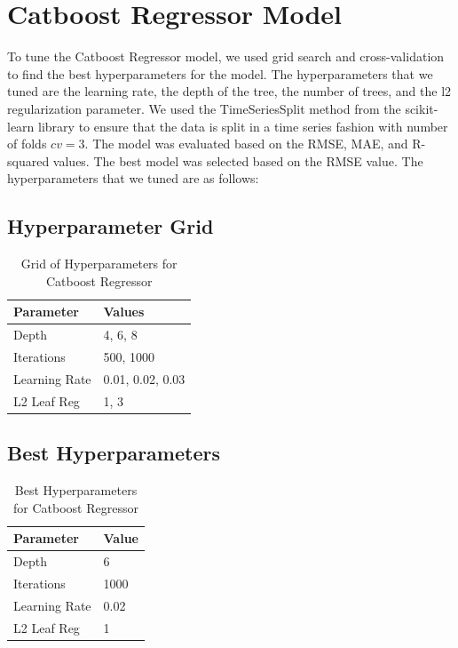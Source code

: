 \section{Catboost Regressor Model}
To tune the Catboost Regressor model, we used grid search and cross-validation to find the best hyperparameters for the model. The hyperparameters that we tuned are the learning rate, the depth of the tree, the number of trees, and the l2 regularization parameter. We used the TimeSeriesSplit method from the scikit-learn library to ensure that the data is split in a time series fashion with number of folds $cv = 3$. The model was evaluated based on the RMSE, MAE, and R-squared values. The best model was selected based on the RMSE value. The hyperparameters that we tuned are as follows:

\subsection*{Hyperparameter Grid}
\begin{table}[h]
\centering
\caption{Grid of Hyperparameters for Catboost Regressor}
\label{tab:hyperparameter_grid}
\begin{tabular}{@{}ll@{}}
\toprule
Parameter       & Values         \\ \midrule
Depth           & 4, 6, 8        \\
Iterations      & 500, 1000      \\
Learning Rate   & 0.01, 0.02, 0.03 \\
L2 Leaf Reg     & 1, 3           \\ \bottomrule
\end{tabular}
\end{table}

\subsection*{Best Hyperparameters}
\begin{table}[h]
\centering
\caption{Best Hyperparameters for Catboost Regressor}
\label{tab:best_hyperparameters}
\begin{tabular}{@{}ll@{}}
\toprule
Parameter       & Value          \\ \midrule
Depth           & 6              \\
Iterations      & 1000           \\
Learning Rate   & 0.02           \\
L2 Leaf Reg     & 1              \\ \bottomrule
\end{tabular}
\end{table}


